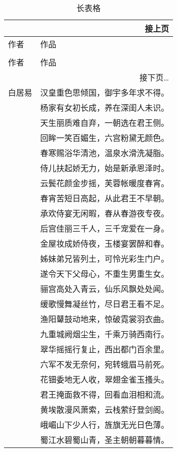 \begin{longtable}{ll}
  \multicolumn{2}{r}{接上页} \\
  \toprule
  作者 & 作品 \\
  \midrule
  \endhead
\caption{长表格} \\
  \toprule
  作者 & 作品 \\
  \midrule
  \endfirsthead
  \bottomrule
  \multicolumn{2}{r}{接下页\dots} \\
  \endfoot
  \bottomrule
  \endlastfoot
  白居易 & 汉皇重色思倾国，御宇多年求不得。\\
  & 杨家有女初长成，养在深闺人未识。\\
  & 天生丽质难自弃，一朝选在君王侧。\\
  & 回眸一笑百媚生，六宫粉黛无颜色。\\
  & 春寒赐浴华清池，温泉水滑洗凝脂。\\
  & 侍儿扶起娇无力，始是新承恩泽时。\\
  & 云鬓花颜金步摇，芙蓉帐暖度春宵。\\
  & 春宵苦短日高起，从此君王不早朝。\\
  & 承欢侍宴无闲暇，春从春游夜专夜。\\
  & 后宫佳丽三千人，三千宠爱在一身。\\
  & 金屋妆成娇侍夜，玉楼宴罢醉和春。\\
  & 姊妹弟兄皆列土，可怜光彩生门户。\\
  & 遂令天下父母心，不重生男重生女。\\
  & 骊宫高处入青云，仙乐风飘处处闻。\\
  & 缓歌慢舞凝丝竹，尽日君王看不足。\\
  & 渔阳鼙鼓动地来，惊破霓裳羽衣曲。\\
  & 九重城阙烟尘生，千乘万骑西南行。\\
  & 翠华摇摇行复止，西出都门百余里。\\
  & 六军不发无奈何，宛转蛾眉马前死。\\
  & 花钿委地无人收，翠翅金雀玉搔头。\\
  & 君王掩面救不得，回看血泪相和流。\\
  & 黄埃散漫风萧索，云栈萦纡登剑阁。\\
  & 峨嵋山下少人行，旌旗无光日色薄。\\
  & 蜀江水碧蜀山青，圣主朝朝暮暮情。\\
\end{longtable}

